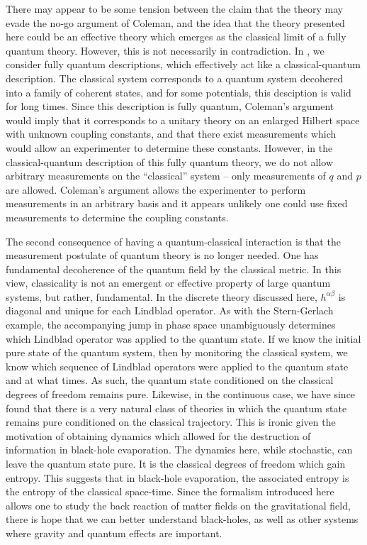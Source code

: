 \documentclass[aps,pra,showpacs,citeautoscript,amsmath,amssymb,floatfix,superscriptaddress,bbm, verbatim,amsfonts,changes,10pt,nofootinbib,longbibliography]{revtex4-1}
\def\ab{^{\alpha\beta}}
\begin{document}
\label{par:tension}
	There may appear to be some tension  between the claim that the theory may evade the no-go argument of Coleman, and the idea that the theory presented here could be an effective theory which emerges as the classical limit of a fully quantum theory. However, this is not necessarily in contradiction.
	In \cite{UCLQQtoCQ}, we consider fully quantum descriptions, which effectively act like a classical-quantum description. The classical system corresponds to a quantum system decohered into a family of coherent states, and for some potentials, this desciption is valid for long times. Since this description is fully quantum, Coleman's argument would imply that it corresponds to a unitary theory on an enlarged Hilbert space with unknown coupling constants, and that there exist measurements which would allow an experimenter to determine these constants.  However, in the classical-quantum description of this fully quantum theory, we do not allow arbitrary measurements on the ``classical'' system -- only measurements of $q$ and $p$ are allowed. Coleman's argument allows the experimenter to perform measurements in an arbitrary basis and it appears unlikely one could use fixed measurements to determine the coupling constants. 


The second consequence of having a quantum-classical interaction is that the measurement postulate of quantum theory is no longer needed. One has fundamental decoherence of the quantum field by the classical metric. In this view, classicality is not an emergent or effective property of large quantum systems, but rather, fundamental.
In the discrete theory discussed here, $h\ab$ is diagonal and unique for each Lindblad operator. As with the Stern-Gerlach example, the accompanying jump in phase space unambiguously determines which Lindblad operator was applied to the quantum state. If we know the initial pure state of the quantum system, then by monitoring the classical system, we know which sequence of Lindblad operators were applied to the quantum state and at what times. As such, the quantum state conditioned on the classical degrees of freedom remains pure. Likewise, in the continuous case, we have since found that 
there is a very natural class of theories in which the quantum state remains pure conditioned on the classical trajectory\cite{layton2022semi}.
	This is 
ironic given the motivation of obtaining dynamics which allowed for the destruction of information in black-hole evaporation. The dynamics here, while stochastic, can leave the quantum state pure. It is the classical degrees of freedom which gain entropy.
This suggests that in black-hole evaporation, the associated entropy is the entropy of the classical space-time. Since the formalism introduced here allows one to study the back reaction of matter fields on the gravitational field, there is hope that we can better understand black-holes, as well as other systems where gravity and quantum effects are important.
\end{document}

